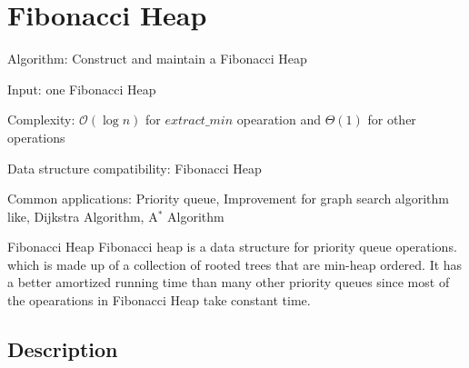 \documentclass[catalog.tex]{subfiles}
\begin{document}
\def\pbname{Fibonacci Heap} %

\section{\pbname} 

\begin{overview}
\item [Algorithm:] Construct and maintain a Fibonacci Heap
\item [Input:] one Fibonacci Heap
\item [Complexity:]$\mathcal{O}(\log n)$ for $extract\_min$ opearation and $\Theta(1)$ for other operations
\item [Data structure compatibility:] Fibonacci Heap
\item [Common applications:] Priority queue, Improvement for graph search algorithm like, Dijkstra Algorithm, A$^*$ Algorithm
\end{overview}


\begin{problem}{\pbname}
	Fibonacci heap is a data structure for priority queue operations. which is made up of a collection of rooted trees that are min-heap ordered. It has a better amortized running time than many other priority queues since most of the opearations in Fibonacci Heap take constant time.
\end{problem}

\subsection*{Description}
\end{document}

